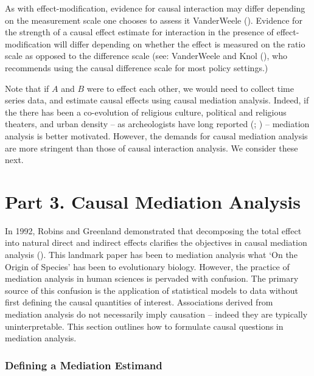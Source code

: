 \documentclass[
  single column]{article}
\begin{document}
As with effect-modification, evidence for causal interaction may differ
depending on the measurement scale one chooses to assess it VanderWeele
(). Evidence for the strength of a
causal effect estimate for interaction in the presence of
effect-modification will differ depending on whether the effect is
measured on the ratio scale as opposed to the difference scale (see:
VanderWeele and Knol (), who
recommends using the causal difference scale for most policy settings.)

Note that if \(A\) and \(B\) were to effect each other, we would need to
collect time series data, and estimate causal effects using causal
mediation analysis. Indeed, if the there has been a co-evolution of
religious culture, political and religious theaters, and urban density
-- as archeologists have long reported
(;
) -- mediation analysis
is better motivated. However, the demands for causal mediation analysis
are more stringent than those of causal interaction analysis. We
consider these next.

\section{Part 3. Causal Mediation
Analysis}\label{part-3.-causal-mediation-analysis}

In 1992, Robins and Greenland demonstrated that decomposing the total
effect into natural direct and indirect effects clarifies the objectives
in causal mediation analysis (). This landmark paper has been to mediation analysis
what `On the Origin of Species' has been to evolutionary biology.
However, the practice of mediation analysis in human sciences is
pervaded with confusion. The primary source of this confusion is the
application of statistical models to data without first defining the
causal quantities of interest. Associations derived from mediation
analysis do not necessarily imply causation -- indeed they are typically
uninterpretable. This section outlines how to formulate causal questions
in mediation analysis.

\subsubsection{Defining a Mediation
Estimand}\label{defining-a-mediation-estimand}
\end{document}
